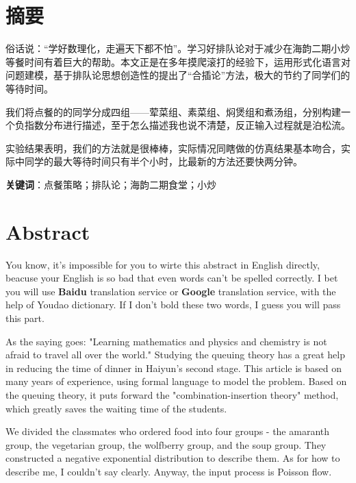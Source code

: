 \documentclass[a4paper,12pt]{book} %
\newcommand*{\kai}{\CJKfamily{zhkai}}  %
\begin{document}
\rightline{\kai 小炒一霸~~~~于海韵}
\rightline{\kai 二〇一八年五月}

\clearpage{\pagestyle{empty}\cleardoublepage}    %


\chapter*{摘要}

俗话说：“学好数理化，走遍天下都不怕”。学习好排队论对于减少在海韵二期小炒等餐时间有着巨大的帮助。本文正是在多年摸爬滚打的经验下，运用形式化语言对问题建模，基于排队论思想创造性的提出了“合插论”方法，极大的节约了同学们的等待时间。

我们将点餐的的同学分成四组——荤菜组、素菜组、焖煲组和煮汤组，分别构建一个负指数分布进行描述，至于怎么描述我也说不清楚，反正输入过程就是泊松流。

实验结果表明，我们的方法就是很棒棒，实际情况同瞎做的仿真结果基本吻合，实际中同学的最大等待时间只有半个小时，比最新的方法还要快两分钟。
\newline

\textbf{关键词}：点餐策略；排队论；海韵二期食堂；小炒

\clearpage{\pagestyle{empty}\cleardoublepage}


\chapter*{Abstract}

You know, it's impossible for you to wirte this abstract in English directly, beacuse your English is so bad that even words can't be spelled correctly. I bet you will use \textbf{\Large Baidu} translation service or \textbf{\Large Google} translation service, with the help of Youdao dictionary. If I don't bold these two words, I guess you will pass this part.

As the saying goes: "Learning mathematics and physics and chemistry is not afraid to travel all over the world." Studying the queuing theory has a great help in reducing the time of dinner in Haiyun's second stage. This article is based on many years of experience, using formal language to model the problem. Based on the queuing theory, it puts forward the "combination-insertion theory" method, which greatly saves the waiting time of the students.

We divided the classmates who ordered food into four groups - the amaranth group, the vegetarian group, the wolfberry group, and the soup group. They constructed a negative exponential distribution to describe them. As for how to describe me, I couldn't say clearly. Anyway, the input process is Poisson flow.
\end{document}
